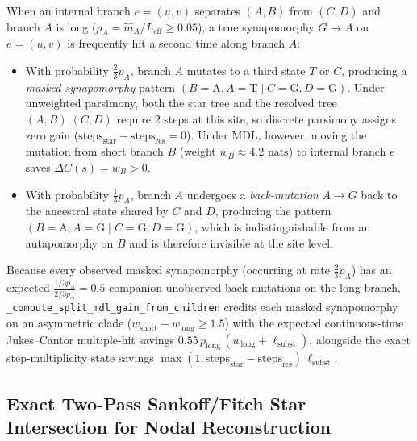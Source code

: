 \documentclass[11pt,a4paper]{article}
\begin{document}
When an internal branch $e=(u,v)$ separates $(A,B)$ from $(C,D)$ and branch $A$ is long ($p_A = \hat{m}_A / L_{\text{eff}} \ge 0.05$), a true synapomorphy $G \to A$ on $e=(u,v)$ is frequently hit a second time along branch $A$:
\begin{itemize}[leftmargin=1.8em]
    \item With probability $\frac{2}{3}p_A$, branch $A$ mutates to a third state $T$ or $C$, producing a \emph{masked synapomorphy} pattern $(B=\text{A}, A=\text{T} \mid C=\text{G}, D=\text{G})$. Under unweighted parsimony, both the star tree and the resolved tree $(A,B)|(C,D)$ require $2$ steps at this site, so discrete parsimony assigns zero gain ($\text{steps}_{\text{star}} - \text{steps}_{\text{res}} = 0$). Under MDL, however, moving the mutation from short branch $B$ (weight $w_B \approx 4.2\text{ nats}$) to internal branch $e$ saves $\Delta C(s) = w_B > 0$.
    \item With probability $\frac{1}{3}p_A$, branch $A$ undergoes a \emph{back-mutation} $A \to G$ back to the ancestral state shared by $C$ and $D$, producing the pattern $(B=\text{A}, A=\text{G} \mid C=\text{G}, D=\text{G})$, which is indistinguishable from an autapomorphy on $B$ and is therefore invisible at the site level.
\end{itemize}
Because every observed masked synapomorphy (occurring at rate $\frac{2}{3}p_A$) has an expected $\frac{1/3 p_A}{2/3 p_A} = 0.5$ companion unobserved back-mutations on the long branch, \texttt{\_compute\_split\_mdl\_gain\_from\_children} credits each masked synapomorphy on an asymmetric clade ($w_{\text{short}} - w_{\text{long}} \ge 1.5$) with the expected continuous-time Jukes--Cantor multiple-hit savings $0.55\,p_{\text{long}}\,(w_{\text{long}} + \ell_{\text{subst}})$, alongside the exact step-multiplicity state savings $\max(1, \text{steps}_{\text{star}} - \text{steps}_{\text{res}})\,\ell_{\text{subst}}$.

\subsection{Exact Two-Pass Sankoff/Fitch Star Intersection for Nodal Reconstruction}
\end{document}
